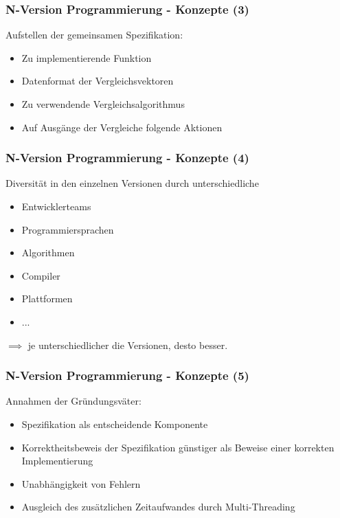%
%
\begin{frame}
	\frametitle{N-Version Programmierung - Konzepte (3)}
	Aufstellen der gemeinsamen Spezifikation:
	\begin{itemize}
		\item Zu implementierende Funktion
		\item Datenformat der Vergleichsvektoren
		\item Zu verwendende Vergleichsalgorithmus
		\item Auf Ausgänge der Vergleiche folgende Aktionen
	\end{itemize}
\end{frame}
%
%
\begin{frame}
	\frametitle{N-Version Programmierung - Konzepte (4)}
	Diversität in den einzelnen Versionen durch unterschiedliche
	\begin{itemize}
		\item Entwicklerteams
		\item Programmiersprachen
		\item Algorithmen
		\item Compiler
		\item Plattformen
		\item ...
	\end{itemize}
	$\implies$ je unterschiedlicher die Versionen, desto besser.
\end{frame}
%
%
\begin{frame}
	\frametitle{N-Version Programmierung - Konzepte (5)}
	Annahmen der Gründungsväter:
	\begin{itemize}		
		\item Spezifikation als entscheidende Komponente		
		\item Korrektheitsbeweis der Spezifikation günstiger als Beweise einer korrekten Implementierung
		\item Unabhängigkeit von Fehlern
		\item Ausgleich des zusätzlichen Zeitaufwandes durch Multi-Threading
	\end{itemize}
\end{frame}
%
%
